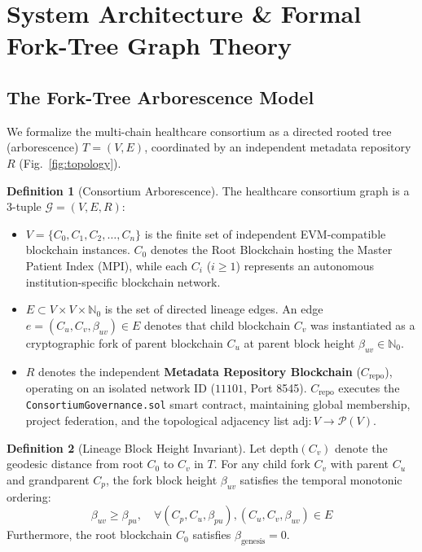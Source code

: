 \documentclass[journal]{IEEEtran}
\theoremstyle{definition}
\newtheorem{definition}{Definition}
\begin{document}
\section{System Architecture \& Formal Fork-Tree Graph Theory}

\subsection{The Fork-Tree Arborescence Model}
We formalize the multi-chain healthcare consortium as a directed rooted tree (arborescence) $T = (V, E)$, coordinated by an independent metadata repository $R$ (Fig.~\ref{fig:topology}).

\begin{definition}[Consortium Arborescence]
The healthcare consortium graph is a 3-tuple $\mathcal{G} = (V, E, R)$:
\begin{itemize}
    \item $V = \{C_0, C_1, C_2, \dots, C_n\}$ is the finite set of independent EVM-compatible blockchain instances. $C_0$ denotes the Root Blockchain hosting the Master Patient Index (MPI), while each $C_i$ ($i \ge 1$) represents an autonomous institution-specific blockchain network.
    \item $E \subset V \times V \times \mathbb{N}_0$ is the set of directed lineage edges. An edge $e = (C_u, C_v, \beta_{uv}) \in E$ denotes that child blockchain $C_v$ was instantiated as a cryptographic fork of parent blockchain $C_u$ at parent block height $\beta_{uv} \in \mathbb{N}_0$.
    \item $R$ denotes the independent \textbf{Metadata Repository Blockchain} ($C_{\text{repo}}$), operating on an isolated network ID ($11101$, Port 8545). $C_{\text{repo}}$ executes the \texttt{ConsortiumGovernance.sol} smart contract, maintaining global membership, project federation, and the topological adjacency list $\text{adj}: V \to \mathcal{P}(V)$.
\end{itemize}
\end{definition}

\begin{definition}[Lineage Block Height Invariant]
Let $\text{depth}(C_v)$ denote the geodesic distance from root $C_0$ to $C_v$ in $T$. For any child fork $C_v$ with parent $C_u$ and grandparent $C_p$, the fork block height $\beta_{uv}$ satisfies the temporal monotonic ordering:
\begin{equation}
\beta_{uv} \ge \beta_{pu}, \quad \forall (C_p, C_u, \beta_{pu}), (C_u, C_v, \beta_{uv}) \in E
\end{equation}
Furthermore, the root blockchain $C_0$ satisfies $\beta_{\text{genesis}} = 0$.
\end{definition}
\end{document}
